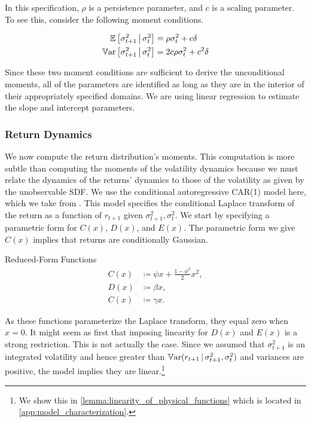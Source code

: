 \documentclass[11pt, letterpaper, twoside]{article}
\begin{document}
In this specification, $\rho$ is a persistence parameter, and $c$ is a scaling parameter. To see this, consider the following moment conditions. 

\begin{remark} 
 \label{remark:vol_moment_conditions}
    \begin{align}
        \E\left[\sigma^2_{t+1} \mvert \sigma^2_t \right] &= \rho \sigma^2_t + c \delta\\
%   
        \Var\left[\sigma^2_{t+1} \mvert \sigma^2_t \right] &= 2 c \rho \sigma^2_t + c^2 \delta 
%   
    \end{align}
\end{remark}

Since these two moment conditions are sufficient to derive the unconditional moments, all of the parameters are identified as long as they are in the interior of their appropriately specified domains. We are using linear regression to estimate the slope and intercept parameters.

\subsubsection{Return Dynamics}

We now compute the return distribution's moments. This computation is more subtle than computing the moments of the volatility dynamics because we must relate the dynamics of the returns' dynamics to those of the volatility as given by the unobservable SDF. We use the conditional autoregressive CAR(1) model here, which we take from \textcite{darolles2006structural,han2018leverage}. This model specifies the conditional Laplace transform of the return as a function of $r_{t+1}$ given $\sigma^2_{t+1}, \sigma^2_t$. We start by specifying a parametric form for $C(x)$, $D(x)$, and $E(x)$. The parametric form we give  $C(x)$ implies that returns are conditionally Gaussian.

\begin{defn}{Reduced-Form Functions}
    \label{defn:physical_return_dynamics}
    \begin{align}
        C(x) &\coloneqq \psi x + \frac{1 - \phi^2}{2} x^2, \\
        D(x) &\coloneqq \beta x, \\
        C(x) &\coloneqq \gamma x. 
    \end{align}
\end{defn}

As these functions parameterize the Laplace transform, they equal zero when $x=0$. It might seem as first that imposing linearity for $D(x)$ and $E(x)$ is a strong restriction. This is not actually the case. Since we assumed that $\sigma^2_{t+1}$ is an integrated volatility and hence greater than $\operatorname{\mathbb{V}ar}(r_{t+1} \,\vert\, \sigma^2_{t+1}, \sigma^2_{t})$ and variances are positive, the model implies they are linear.\footnote{We show this in \cref{lemma:linearity_of_physical_functions} which is located in \cref{app:model_characterization}.}
\end{document}
